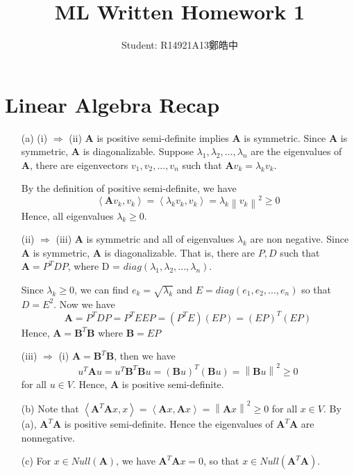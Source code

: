 \documentclass[12pt,a4paper]{article}
\title{ML Written Homework 1}
\author{Student: R14921A13鄭皓中}
\begin{document}
\maketitle

\section{Linear Algebra Recap}

\begin{enumerate}
    \item [(a)] 
        (i) $\Rightarrow$ (ii) \textbf{A} is positive semi-definite implies \textbf{A} is symmetric. Since \textbf{A} is symmetric, \textbf{A} is diagonalizable.
        Suppose $\lambda_{1}, \lambda_{2}, ..., \lambda_{n}$ are the eigenvalues of \textbf{A}, there are eigenvectors $v_{1}, v_{2}, ..., v_{n}$ such that $\textbf{A}v_{k} = \lambda_{k}v_{k}$.

        By the definition of positive semi-definite, we have
        \[
            \left\langle \textbf{A}v_{k}, v_{k}\right\rangle = \left\langle \lambda_{k}v_{k}, v_{k} \right\rangle = \lambda_{k}\left\lVert v_k \right\rVert^2  \geq 0
        \]
        Hence, all eigenvalues $\lambda_{k} \geq 0$.

        (ii) $\Rightarrow$ (iii) \textbf{A} is symmetric and all of eigenvalues $\lambda_{k}$ are non negative. Since \textbf{A} is symmetric, \textbf{A} is diagonalizable.
        That is, there are $P, D$ such that $\textbf{A} = P^{T}DP$, where D = $diag(\lambda_{1}, \lambda_{2}, ..., \lambda_{n})$.

        Since $\lambda_{k} \geq 0$, we can find $e_{k} = \sqrt{\lambda_{k}}$ and $E = diag(e_{1}, e_{2}, ..., e_{n})$ so that $D = E^2$.
        Now we have
        \[
            \mathbf{A} = P^{T}DP = P^{T}EEP = (P^{T}E)(EP) = (EP)^{T}(EP)
        \]
        Hence, $\mathbf{A} = \mathbf{B}^{T}\mathbf{B}$ where $\mathbf{B} = EP$

        (iii) $\Rightarrow$ (i) $\mathbf{A} = \mathbf{B}^{T}\mathbf{B}$, then we have
        \[
            u^{T}\mathbf{A}u = u^{T}\mathbf{B}^{T} \mathbf{B}u = (\mathbf{B}u)^{T}(\mathbf{B}u) = \left\lVert \mathbf{B}u \right\rVert ^2 \geq 0
        \]
        for all $u \in V$. Hence, \textbf{A} is positive semi-definite. 
    \item[(b)]
        Note that $\left\langle \mathbf{A}^{T}\mathbf{A} x, x \right\rangle = \left\langle \mathbf{A}x, \mathbf{A}x\right\rangle = \left\lVert \mathbf{A}x \right\rVert^2 \geq 0$ for all $x\in V$.
        By (a), $\mathbf{A}^{T}\mathbf{A}$ is positive semi-definite. Hence the eigenvalues of $\mathbf{A}^{T}\mathbf{A}$ are nonnegative.
    \item[(c)]
        For $x\in Null(\mathbf{A})$, we have $\mathbf{A}^{T}\mathbf{A}x = 0$, so that $x\in Null(\mathbf{A}^{T}\mathbf{A})$.
        

\end{enumerate}
\end{document}
